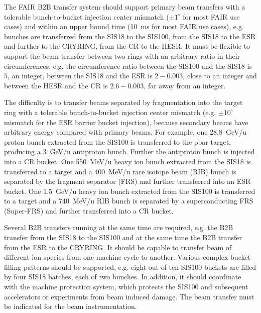 The FAIR B2B transfer system should support primary beam transfers with a tolerable bunch-to-bucket injection center mismatch ($\pm 1^\circ$ for most FAIR use cases) and within an upper bound time (\SI{10}{\ms} for most FAIR use cases), e.g. bunches are transferred from the SIS18 to the SIS100, from the SIS18 to the ESR  and further to the CRYRING, from the CR to the HESR. It must be flexible to support the beam transfer between two rings with an arbitrary ratio in their circumferences, e.g. the circumference ratio between the SIS100 and the SIS18 is $5$, an integer, between the SIS18 and the ESR is $2 - 0.003$, close to an integer and between the HESR and the CR is $2.6 - 0.003$, far away from an integer. 

The difficulty is to transfer beams separated by fragmentation into the target ring with a tolerable bunch-to-bucket injection center mismatch (e.g. $\pm 10^\circ$ mismatch for the ESR barrier bucket injection), because secondary beams have arbitrary energy compared with primary beams. For example, one \SI{28.8}{GeV/u} proton bunch extracted from the SIS100 is transferred to the pbar target, producing a \SI{3}{GeV/u} antiproton bunch. Further the antiproton bunch is injected into a CR bucket. One \SI{550}{MeV/u} heavy ion bunch extracted from the SIS18 is transferred to a target and a \SI{400}{MeV/u} rare isotope beam (RIB) bunch is separated by the fragment separator (FRS) and further transferred into an ESR bucket. One \SI{1.5}{GeV/u} heavy ion bunch extracted from the SIS100 is transferred to a target and a \SI{740}{MeV/u} RIB bunch is separated by a superconducting FRS (Super-FRS) and further transferred into a CR bucket.


Several B2B transfers running at the same time are required, e.g. the B2B transfer from the SIS18 to the SIS100 and at the same time the B2B transfer from the ESR to the CRYRING. It should be capable to transfer beam of different ion species from one machine cycle to another. Various complex bucket filling patterns should be supported, e.g. eight out of ten SIS100 buckets are filled by four SIS18 batches, each of two bunches. In addition, it should coordinate with the machine protection system, which protects the SIS100 and subsequent accelerators or experiments from beam induced damage. The beam transfer must be indicated for the beam instrumentation.
